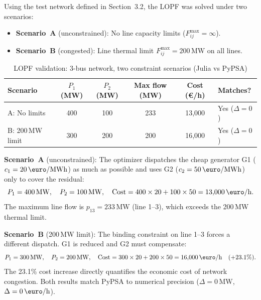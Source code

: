 Using the test network defined in Section~3.2, the LOPF was solved under two scenarios:

\begin{itemize}
    \item \textbf{Scenario~A} (unconstrained): No line capacity limits ($F_{ij}^\text{max} = \infty$).
    \item \textbf{Scenario~B} (congested): Line thermal limit $F_{ij}^\text{max} = 200\,\text{MW}$ on all lines.
\end{itemize}

\begin{table}[H]
\centering
\caption{LOPF validation: 3-bus network, two constraint scenarios (Julia vs PyPSA)}
\label{tab:lopf_validation}
\begin{tabular}{lccccl}
\toprule
\textbf{Scenario} & \textbf{$P_1$ (MW)} & \textbf{$P_2$ (MW)} & \textbf{Max flow (MW)} & \textbf{Cost (\euro/h)} & \textbf{Matches?} \\
\midrule
A: No limits        & 400 & 100 & 233 & 13{,}000 & Yes ($\Delta = 0$) \\
B: 200\,MW limit    & 300 & 200 & 200 & 16{,}000 & Yes ($\Delta = 0$) \\
\bottomrule
\end{tabular}
\end{table}

\textbf{Scenario~A} (unconstrained): The optimizer dispatches the cheap generator G1 ($c_1 = 20\,\text{\euro/MWh}$) as much as possible and uses G2 ($c_2 = 50\,\text{\euro/MWh}$) only to cover the residual:
\begin{equation}
    P_1 = 400\,\text{MW},\quad P_2 = 100\,\text{MW}, \quad
    \text{Cost} = 400 \times 20 + 100 \times 50 = 13{,}000\,\text{\euro/h}.
\end{equation}
The maximum line flow is $p_{13} = 233\,\text{MW}$ (line 1--3), which exceeds the 200\,MW thermal limit.

\textbf{Scenario~B} (200\,MW limit): The binding constraint on line 1--3 forces a different dispatch. G1 is reduced and G2 must compensate:
\begin{equation}
    P_1 = 300\,\text{MW},\quad P_2 = 200\,\text{MW}, \quad
    \text{Cost} = 300 \times 20 + 200 \times 50 = 16{,}000\,\text{\euro/h} \quad (+23.1\%).
\end{equation}
The 23.1\% cost increase directly quantifies the economic cost of network congestion. Both results match PyPSA to numerical precision ($\Delta = 0\,\text{MW}$, $\Delta = 0\,\text{\euro/h}$).

